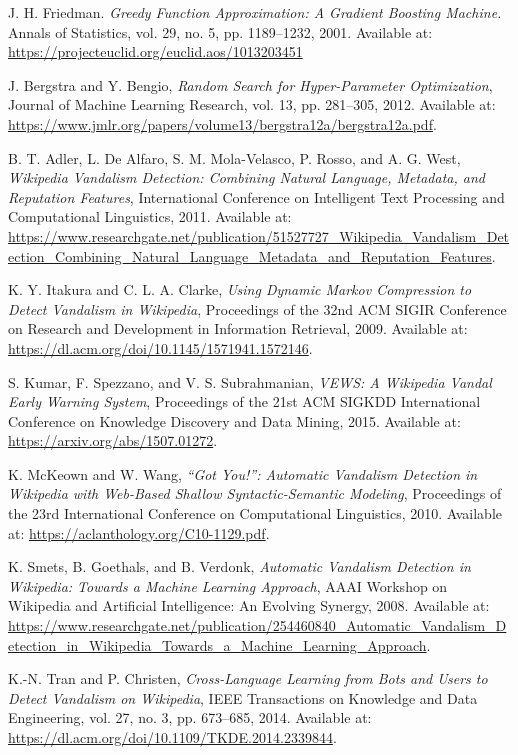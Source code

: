 \documentclass[
    13pt, %
    a4paper, %
    listof=totoc, %
    bibliography=totoc, %
    index=totoc, %
    headsepline
]{scrreprt}
\begin{document}
\begin{thebibliography}{9}
J. H. Friedman.
\textit{Greedy Function Approximation: A Gradient Boosting Machine.}
Annals of Statistics, vol. 29, no. 5, pp. 1189–1232, 2001.
Available at: \url{https://projecteuclid.org/euclid.aos/1013203451}

J. Bergstra and Y. Bengio,
\textit{Random Search for Hyper-Parameter Optimization},
Journal of Machine Learning Research, vol. 13, pp. 281–305, 2012. Available at: \url{https://www.jmlr.org/papers/volume13/bergstra12a/bergstra12a.pdf}.

B. T. Adler, L. De Alfaro, S. M. Mola-Velasco, P. Rosso, and A. G. West,
\textit{Wikipedia Vandalism Detection: Combining Natural Language, Metadata, and Reputation Features},
International Conference on Intelligent Text Processing and Computational Linguistics, 2011. Available at: \url{https://www.researchgate.net/publication/51527727_Wikipedia_Vandalism_Detection_Combining_Natural_Language_Metadata_and_Reputation_Features}.

K. Y. Itakura and C. L. A. Clarke,
\textit{Using Dynamic Markov Compression to Detect Vandalism in Wikipedia},
Proceedings of the 32nd ACM SIGIR Conference on Research and Development in Information Retrieval, 2009. Available at: \url{https://dl.acm.org/doi/10.1145/1571941.1572146}.

S. Kumar, F. Spezzano, and V. S. Subrahmanian,
\textit{VEWS: A Wikipedia Vandal Early Warning System},
Proceedings of the 21st ACM SIGKDD International Conference on Knowledge Discovery and Data Mining, 2015. Available at: \url{https://arxiv.org/abs/1507.01272}.

K. McKeown and W. Wang,
\textit{“Got You!”: Automatic Vandalism Detection in Wikipedia with Web-Based Shallow Syntactic-Semantic Modeling},
Proceedings of the 23rd International Conference on Computational Linguistics, 2010. Available at: \url{https://aclanthology.org/C10-1129.pdf}.

K. Smets, B. Goethals, and B. Verdonk,
\textit{Automatic Vandalism Detection in Wikipedia: Towards a Machine Learning Approach},
AAAI Workshop on Wikipedia and Artificial Intelligence: An Evolving Synergy, 2008. Available at: \url{https://www.researchgate.net/publication/254460840_Automatic_Vandalism_Detection_in_Wikipedia_Towards_a_Machine_Learning_Approach}.

K.-N. Tran and P. Christen,
\textit{Cross-Language Learning from Bots and Users to Detect Vandalism on Wikipedia},
IEEE Transactions on Knowledge and Data Engineering, vol. 27, no. 3, pp. 673–685, 2014. Available at: \url{https://dl.acm.org/doi/10.1109/TKDE.2014.2339844}.


\end{thebibliography}
\end{document}
